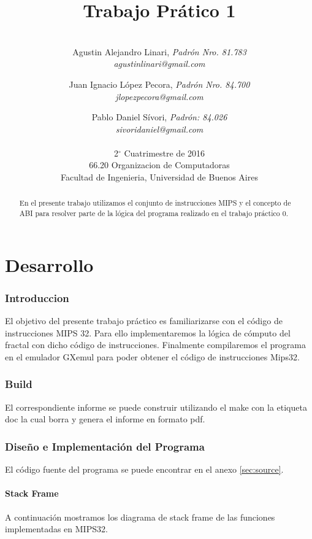 \documentclass{article}
\title{Trabajo Prático 1}
\author{\\
  Agustin Alejandro Linari, \textit{Padrón Nro. 81.783}\\
  \textit{agustinlinari@gmail.com}\\
  \and
  Juan Ignacio López Pecora, \textit{Padrón Nro. 84.700}\\
  \textit{jlopezpecora@gmail.com}\\
  \and
  Pablo Daniel Sívori, \textit{Padrón: 84.026}\\
  \textit{sivoridaniel@gmail.com}\\
  \\
  \normalsize{2$^{\circ}$ Cuatrimestre de 2016}                           \\
  \normalsize{66.20 Organizacion de Computadoras}                  \\
  \normalsize{Facultad de Ingenieria, Universidad de Buenos Aires} \\
}
\begin{document}

\maketitle                   %

\begin{abstract}
En el presente trabajo utilizamos el conjunto de instrucciones MIPS y el concepto de ABI para resolver parte de la lógica del programa realizado en el trabajo práctico 0. 
\end{abstract}

\clearpage

\tableofcontents
\clearpage

\part{Desarrollo}

\section{Introduccion}

El objetivo del presente trabajo práctico es familiarizarse con el código de instrucciones MIPS 32. Para ello implementaremos la lógica de cómputo del fractal con dicho código de instrucciones. 
Finalmente compilaremos el programa en el emulador GXemul para poder obtener el código de instrucciones Mips32.

\section{Build}
El correspondiente informe se puede construir utilizando el make con la etiqueta doc la cual borra y genera el informe en formato pdf.

\section{Diseño e Implementación del Programa}


El código fuente del programa se puede encontrar en el anexo \ref{sec:source}.

\subsection{Stack Frame}
A continuación mostramos los diagrama de stack frame de las funciones implementadas en MIPS32.
\end{document}
